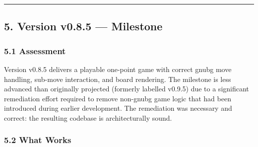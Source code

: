 \documentclass[11pt,a4paper]{article}
\begin{document}
\begin{center}\rule{0.5\linewidth}{0.5pt}\end{center}

\subsection{5. Version v0.8.5 --- Milestone}\label{version-v085}

\subsubsection{5.1 Assessment}\label{assessment-v085}

Version v0.8.5 delivers a playable one-point game with correct gnubg
move handling, sub-move interaction, and board rendering. The milestone
is less advanced than originally projected (formerly labelled v0.9.5)
due to a significant remediation effort required to remove non-gnubg game
logic that had been introduced during earlier development. The remediation
was necessary and correct: the resulting codebase is architecturally
sound.

\subsubsection{5.2 What Works}\label{what-works-v085}
\end{document}
